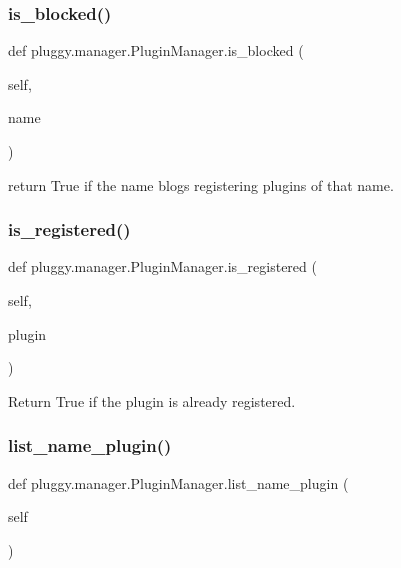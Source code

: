\subsubsection{\texorpdfstring{is\+\_\+blocked()}{is\_blocked()}}
{\footnotesize\ttfamily def pluggy.\+manager.\+Plugin\+Manager.\+is\+\_\+blocked (\begin{DoxyParamCaption}\item[{}]{self,  }\item[{}]{name }\end{DoxyParamCaption})}

\begin{DoxyVerb}return True if the name blogs registering plugins of that name. \end{DoxyVerb}
 \mbox{\label{classpluggy_1_1manager_1_1_plugin_manager_a42f02527adb6b90ec57f4ff3d6235a98}} 
\subsubsection{\texorpdfstring{is\+\_\+registered()}{is\_registered()}}
{\footnotesize\ttfamily def pluggy.\+manager.\+Plugin\+Manager.\+is\+\_\+registered (\begin{DoxyParamCaption}\item[{}]{self,  }\item[{}]{plugin }\end{DoxyParamCaption})}

\begin{DoxyVerb}Return True if the plugin is already registered. \end{DoxyVerb}
 \mbox{\label{classpluggy_1_1manager_1_1_plugin_manager_af49b57685654d86b409fbc4280f6bf10}} 
\subsubsection{\texorpdfstring{list\+\_\+name\+\_\+plugin()}{list\_name\_plugin()}}
{\footnotesize\ttfamily def pluggy.\+manager.\+Plugin\+Manager.\+list\+\_\+name\+\_\+plugin (\begin{DoxyParamCaption}\item[{}]{self }\end{DoxyParamCaption})}

